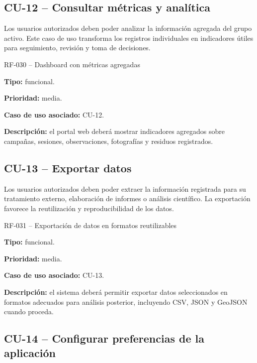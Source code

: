 \subsection{CU-12 -- Consultar métricas y analítica}

Los usuarios autorizados deben poder analizar la información agregada del grupo
activo. Este caso de uso transforma los registros individuales en indicadores
útiles para seguimiento, revisión y toma de decisiones.

\begin{requisitocard}{RF-030 -- Dashboard con métricas agregadas}

\textbf{Tipo:} funcional.

\textbf{Prioridad:} media.

\textbf{Caso de uso asociado:} CU-12.

\textbf{Descripción:} el portal web deberá mostrar indicadores agregados sobre
campañas, sesiones, observaciones, fotografías y residuos registrados.

\end{requisitocard}

\subsection{CU-13 -- Exportar datos}

Los usuarios autorizados deben poder extraer la información registrada para su
tratamiento externo, elaboración de informes o análisis científico. La
exportación favorece la reutilización y reproducibilidad de los datos.

\begin{requisitocard}{RF-031 -- Exportación de datos en formatos reutilizables}

\textbf{Tipo:} funcional.

\textbf{Prioridad:} media.

\textbf{Caso de uso asociado:} CU-13.

\textbf{Descripción:} el sistema deberá permitir exportar datos seleccionados en
formatos adecuados para análisis posterior, incluyendo CSV, JSON y GeoJSON cuando
proceda.

\end{requisitocard}

\subsection{CU-14 -- Configurar preferencias de la aplicación}

